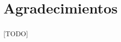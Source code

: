 \documentclass{subfiles}
\begin{document}
  \chapter*{Agradecimientos}
  \label{sec:acknowledgements}

    \paragraph{}
    [TODO]
\end{document}
